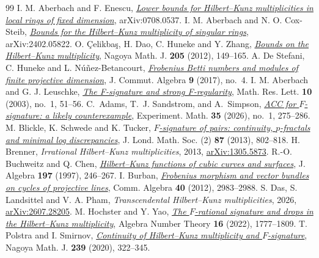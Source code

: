 \documentclass[11pt,a4paper,reqno]{amsart}
\numberwithin{equation}{section}
\theoremstyle{plain}
\begin{document}
\begin{thebibliography}{99}
I. M. Aberbach and F. Enescu, \href{https://arxiv.org/abs/0708.0537}{\emph{Lower bounds for Hilbert--Kunz multiplicities in local rings of fixed dimension}}, arXiv:0708.0537.
I. M. Aberbach and N. O. Cox-Steib, \href{https://arxiv.org/abs/2402.05822}{\emph{Bounds for the Hilbert--Kunz multiplicity of singular rings}}, arXiv:2402.05822.
O. \c{C}elikba\c{s}, H. Dao, C. Huneke and Y. Zhang, \href{https://doi.org/10.1215/00277630-1543805}{\emph{Bounds on the Hilbert--Kunz multiplicity}}, Nagoya Math. J. \textbf{205} (2012), 149--165.
A. De Stefani, C. Huneke and L. N\'u\~nez-Betancourt, \href{https://arxiv.org/abs/1412.4266}{\emph{Frobenius Betti numbers and modules of finite projective dimension}}, J. Commut. Algebra \textbf{9} (2017), no.~4.
I. M. Aberbach and G. J. Leuschke, \href{https://doi.org/10.4310/MRL.2003.v10.n1.a6}{\emph{The F-signature and strong
F-regularity}}, Math. Res. Lett. \textbf{10} (2003), no.~1, 51--56.
C.~Adams, T.~J. Sandstrom, and A.~Simpson,
\href{https://doi.org/10.1080/10586458.2025.2470148}{\emph{ACC for $F$-signature: a likely counterexample}},
Experiment. Math. \textbf{35} (2026), no.~1, 275--286.
M. Blickle, K. Schwede and K. Tucker,
\href{https://doi.org/10.1112/jlms/jds070}{\emph{$F$-signature of pairs: continuity, $p$-fractals and minimal log discrepancies}},
J. Lond. Math. Soc. (2) \textbf{87} (2013), 802--818.
H. Brenner, \emph{Irrational Hilbert--Kunz multiplicities}, 2013, \href{https://arxiv.org/abs/1305.5873}{arXiv:1305.5873}.
R.-O. Buchweitz and Q. Chen,
\href{https://arxiv.org/abs/alg-geom/9610009}{\emph{Hilbert--Kunz functions of cubic curves and surfaces}},
J. Algebra \textbf{197} (1997), 246--267.
I. Burban, \href{https://doi.org/10.1080/00927872.2011.588633}{\emph{Frobenius morphism and vector bundles on cycles of projective lines}}, Comm. Algebra \textbf{40} (2012), 2983--2988.
S. Das, S. Landsittel and V. A. Pham, \emph{Transcendental Hilbert--Kunz multiplicities}, 2026, \href{https://arxiv.org/abs/2607.28205}{arXiv:2607.28205}.
M. Hochster and Y. Yao, \href{https://doi.org/10.2140/ant.2022.16.1777}{\emph{The $F$-rational signature and drops in the Hilbert--Kunz multiplicity}}, Algebra Number Theory \textbf{16} (2022), 1777--1809.
T. Polstra and I. Smirnov, \href{https://doi.org/10.1017/nmj.2018.43}{\emph{Continuity of Hilbert--Kunz multiplicity and $F$-signature}}, Nagoya Math. J. \textbf{239} (2020), 322--345.

\end{thebibliography}
\end{document}
